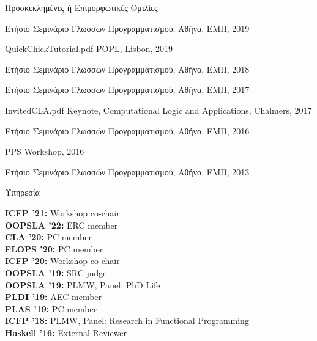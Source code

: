 \documentclass{resume} %
\begin{document}
\newcommand{\apls}[1]{\textgreek{Ετήσιο Σεμινάριο Γλωσσών Προγραμματισμού, Αθήνα, ΕΜΠ, #1}}

\begin{rSection}{\textgreek{Προσκεκλημένες ή Επιμορφωτικές Ομιλίες}}


    {}
    {\apls{2019}}
  
    {QuickChickTutorial.pdf}
    {POPL, \textgreek{Lisbon}, 2019}

     {}
    {\apls{2018}}

     {}
     {\apls{2017}}     

     {InvitedCLA.pdf}
     {Keynote, Computational Logic and Applications, Chalmers, 2017}

     {}
     {\apls{2016}}

     {}
     {PPS Workshop, 2016}

     {}
     {\apls{2013}}     
     
\end{rSection}


\newcommand{\serve}[2]{
  {\bf #1:} #2 \\
  }


\begin{rSection}{\textgreek{Υπηρεσία}}

  \serve{ICFP '21}{Workshop co-chair}
  \serve{OOPSLA '22}{ERC member}
  \serve{CLA '20}{PC member}
  \serve{FLOPS '20}{PC member}
  \serve{ICFP '20}{Workshop co-chair}
  \serve{OOPSLA '19}{SRC judge}
  \serve{OOPSLA '19}{PLMW, Panel: PhD Life}
  \serve{PLDI '19}{AEC member}
  \serve{PLAS '19}{PC member}
  \serve{ICFP '18}{PLMW, Panel: Research in Functional Programming}
  \serve{Haskell '16}{External Reviewer}
  
\end{rSection}


\end{document}
